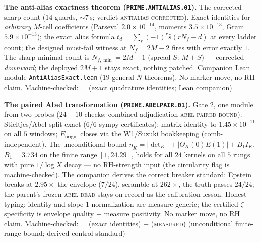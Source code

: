 \par\smallskip\noindent\textbf{The anti-alias exactness theorem
(\texttt{PRIME.ANTIALIAS.01}).}
The corrected sharp count ($14$ guards, ${\sim}7$\,s; verdict
\textsc{antialias-corrected}).  Exact identities for
\emph{arbitrary} $M$-cell coefficients (Parseval
$2.0\times10^{-14}$, moments $3.5\times10^{-13}$, Gram
$5.9\times10^{-13}$); the exact alias formula
$t_d=\sum_r(-1)^r\hat s(rN_f-d)$ at every ladder count; the
designed must-fail witness at $N_f=2M{-}2$ fires with error exactly
$1$.  The sharp minimal count is $N_{f,\min}=2M{-}1$ (spread-$S$:
$M{+}S$) --- corrected \emph{downward}; the deployed $2M{+}1$ stays
exact, nothing patched.  Companion Lean module
\texttt{AntiAliasExact.lean} ($19$ general-$N$ theorems).  No
marker move, no RH claim.
Machine-checked: .
\mE\ (exact quadrature identities; Lean companion)
\par\smallskip


\par\smallskip\noindent\textbf{The paired Abel transformation
(\texttt{PRIME.ABELPAIR.01}).}
Gate 2, one module from two probes ($24{+}10$ checks; combined
adjudication \textsc{abel-paired-bound}).  Stieltjes/Abel split
exact ($6/6$ sympy certificates); matrix identity to
$1.45\times10^{-11}$ on all $5$ windows; $E_{\mathrm{origin}}$
closes via the W1/Suzuki bookkeeping (comb-independent).  The
unconditional bound
$\eta_K=|\det_K|+|\Theta_K(0)E(1)|+B_1I_K$, $B_1=3.734$ on the
finite range $[1,24.29]$, holds for all $24$ kernels on all $5$
rungs with pure $1/\log X$ decay --- no RH-strength input (the
circularity flag is machine-checked).  The companion derives the
correct breaker standard: Epstein breaks at $2.95\times$ the
envelope ($7/24$), scramble at $262\times$, the truth passes
$24/24$; the parent's frozen \textsc{abel-dead} stays on record as
the calibration lesson.  Honest typing: identity and slope-$1$
normalization are measure-generic; the certified
$\zeta$-specificity is envelope quality $+$ measure positivity.  No
marker move, no RH claim.
Machine-checked: .
\mE\ (exact identities) $+$ (\textsc{measured}) (unconditional
finite-range bound; derived control standard)
\par\smallskip


